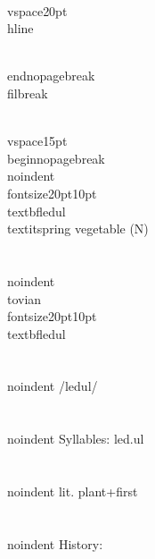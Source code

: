 \\vspace{20pt}\\hline

\\end{nopagebreak}
\\filbreak



\\vspace{15pt}
\\begin{nopagebreak}
\\noindent{\\fontsize{20pt}{10pt}\\textbf{ledul} } \\textit{spring vegetable} (N)\\\\
\\noindent {\\tovian \\fontsize{20pt}{10pt} \\textbf{ledul} }\\\\
\\noindent /l{\textprimstress}edul/\\\\
\\noindent Syllables: led.ul\\\\
\\noindent lit. plant+first\\\\


\\noindent History:

